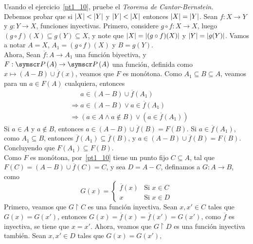 \item Usando el ejercicio~\ref{pt1_10}, pruebe el \emph{Teorema de Cantor-Bernstein}. \\
    Debemos probar que si \(\left|X\right| < \left|Y\right|\) y \(\left|Y\right| < \left|X\right|\) entonces \(\left|X\right| = \left|Y\right|\). 
    Sean \(f: X \rightarrow Y\) y \(g: Y \rightarrow X\), funciones inyectivas.
    Primero, considere \(g \circ f: X \rightarrow X\), luego \((g \circ f)(X) \subseteq g(Y) \subseteq X\), y note que \(\left|X\right| = \left|(g \circ f)(X)\right|\) y \(\left|Y\right| = \left|g(Y)\right|\).
    Vamos a notar \(A = X\), \(A_1 = (g \circ f)(X)\) y \(B = g(Y)\). \\
    Ahora, Sean \(\overline{f}: A \rightarrow A_1\) una función biyectiva, y \(F: \fps{A} \rightarrow \fps{A}\) una función, 
    definida como \(x \mapsto (A - B) \cup \overline{f}(x)\), veamos que \(F\) es monótona.
    Como \(A_1 \subseteq B \subseteq A\),
    veamos para un \(a \in F(A)\) cualquiera, entonces 
    \[
        \begin{aligned}
            &\phantom{\Rightarrow} a \in (A - B) \cup \overline{f}(A_1) \\
            &\Rightarrow a \in (A - B) \vee a \in \overline{f}(A_1) \\
            &\Rightarrow (a \in A \wedge a \not\in B) \vee (a \in \overline{f}(A_1))
        \end{aligned}
    \]
    Si \(a \in A\) y \(a \not\in B\), entonces \(a \in (A - B) \cup \overline{f}(B) = F(B)\).
    Si \(a \in \overline{f}(A_1)\), como \(A_1 \subseteq B\), entonces \(\overline{f}(A_1) \subseteq \overline{f}(B)\), 
    y \(a \in (A - B) \cup \overline{f}(B) = F(B)\). Concluyendo que \(F(A_1) \subseteq F(B)\). \\
    Como \(F\) es monótona, por~\ref{pt1_10} tiene un punto fijo \(C \subseteq A\), tal que \(F(C) = (A - B) \cup \overline{f}(C) = C\), y sea \(D = A - C\), 
    definamos a \(G: A \rightarrow B\), como 
    \[
        G(x) = 
        \begin{cases}
            \overline{f}(x) & \text{Si } x \in C \\
            x & \text{Si } x \in D
        \end{cases}
    \]
    Primero, veamos que \(G \upharpoonright C\) es una función inyectiva. Sean \(x, x' \in C\) tales que \(G(x) = G(x')\), 
    entonces \(G(x) = \overline{f}(x) = \overline{f}(x') = G(x')\), como \(\overline{f}\) es inyectiva, se tiene que \(x = x'\).
    Ahora, veamos que \(G \upharpoonright D\) es una función inyectiva también. Sean \(x, x' \in D\) tales que \(G(x) = G(x')\),
